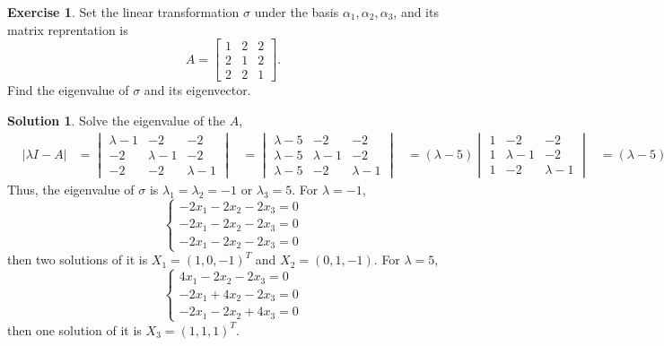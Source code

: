 \documentclass{article}
\theoremstyle{definition}
\newtheorem{exe}{Exercise}[section]
\newtheorem{sol}{Solution}[exe]
\begin{document}
\begin{exe}
    Set the linear transformation $\sigma$ under the basis 
    $\alpha_{1},\alpha_{2},\alpha_{3}$, and its matrix reprentation is 
    $$A=
    \begin{bmatrix} 
        1&2&2\\
        2&1&2\\
        2&2&1
    \end{bmatrix}.$$
    Find the eigenvalue of $\sigma$ and its eigenvector.
\end{exe}

\begin{sol}
    Solve the eigenvalue of the $A$,
    \begin{align*}
    &|\lambda I-A|
    &=
    \begin{vmatrix}
        \lambda-1&-2&-2\\
        -2&\lambda-1&-2\\
        -2&-2&\lambda-1
    \end{vmatrix}
    &=
    \begin{vmatrix}
        \lambda-5&-2&-2\\
        \lambda-5&\lambda-1&-2\\
        \lambda-5&-2&\lambda-1
    \end{vmatrix}
    &=(\lambda-5)
    \begin{vmatrix}
        1&-2&-2\\
        1&\lambda-1&-2\\
        1&-2&\lambda-1
    \end{vmatrix}
    &=(\lambda-5)
    \begin{vmatrix}
        1&0&0\\
        1&\lambda+1&0\\
        1&0&\lambda+1
    \end{vmatrix}
    &=(\lambda+1)^{2}(\lambda-5)
    \end{align*}
    Thus, the eigenvalue of $\sigma$ is $\lambda_{1}=\lambda_{2}=-1$ or $\lambda_{3}=5$.
    For $\lambda=-1$,
    $$
    \begin{cases}
        -2x_{1}-2x_{2}-2x_{3}=0\\
        -2x_{1}-2x_{2}-2x_{3}=0\\
        -2x_{1}-2x_{2}-2x_{3}=0
    \end{cases}
    $$
    then two solutions of it is $X_{1}=(1,0,-1)^{T}$ and 
    $X_{2}=(0,1,-1)$.
    For $\lambda=5$,
    $$
    \begin{cases}
        4x_{1}-2x_{2}-2x_{3}=0\\
        -2x_{1}+4x_{2}-2x_{3}=0\\
        -2x_{1}-2x_{2}+4x_{3}=0
    \end{cases}
    $$
    then one solution of it is $X_{3}=(1,1,1)^{T}$.


\end{sol}
\end{document}
